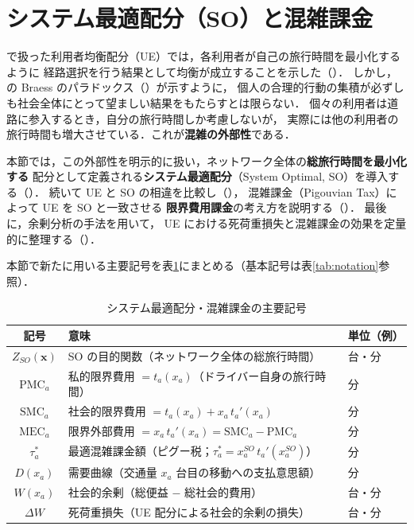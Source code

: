 
\section{システム最適配分（SO）と混雑課金}
\label{sec:ch5-so}

で扱った利用者均衡配分（UE）では，各利用者が自己の旅行時間を最小化するように
経路選択を行う結果として均衡が成立することを示した（）．
しかし，の Braess のパラドックス（）が示すように，
個人の合理的行動の集積が必ずしも社会全体にとって望ましい結果をもたらすとは限らない．
個々の利用者は道路に参入するとき，自分の旅行時間しか考慮しないが，
実際には他の利用者の旅行時間も増大させている．これが\textbf{混雑の外部性}である．

本節では，この外部性を明示的に扱い，ネットワーク全体の\textbf{総旅行時間を最小化する}
配分として定義される\textbf{システム最適配分}（System Optimal, SO）を導入する（）．
続いて UE と SO の相違を比較し（），
混雑課金（Pigouvian Tax）によって UE を SO と一致させる
\textbf{限界費用課金}の考え方を説明する（）．
最後に，余剰分析の手法を用いて，
UE における死荷重損失と混雑課金の効果を定量的に整理する（）\cite{Pigou1920,Beckmann1956}．

本節で新たに用いる主要記号を表\ref{tab:ch5-notation}にまとめる（基本記号は表\ref{tab:notation}参照）．

\begin{table}[hbtp]
  \centering
  \caption{システム最適配分・混雑課金の主要記号}
  \label{tab:ch5-notation}
  \begin{tabular}{cll}
    \toprule
    記号 & 意味 & 単位（例） \\
    \midrule
    $Z_{SO}(\boldsymbol{x})$   & SO の目的関数（ネットワーク全体の総旅行時間） & 台・分 \\
    $\mathrm{PMC}_a$           & 私的限界費用 $= t_a(x_a)$（ドライバー自身の旅行時間） & 分 \\
    $\mathrm{SMC}_a$           & 社会的限界費用 $= t_a(x_a) + x_a\, t_a'(x_a)$ & 分 \\
    $\mathrm{MEC}_a$           & 限界外部費用 $= x_a\, t_a'(x_a) = \mathrm{SMC}_a - \mathrm{PMC}_a$ & 分 \\
    $\tau_a^*$                 & 最適混雑課金額（ピグー税；$\tau_a^* = x_a^{SO}\, t_a'(x_a^{SO})$） & 分 \\
    $D(x_a)$                   & 需要曲線（交通量 $x_a$ 台目の移動への支払意思額） & 分 \\
    $W(x_a)$                   & 社会的余剰（総便益 $-$ 総社会的費用） & 台・分 \\
    $\Delta W$                 & 死荷重損失（UE 配分による社会的余剰の損失） & 台・分 \\
    \bottomrule
  \end{tabular}
\end{table}

